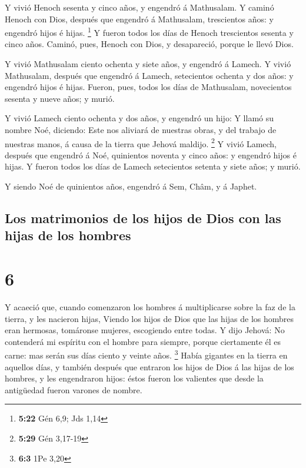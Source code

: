  Y vivió Henoch sesenta y cinco años, y engendró á
Mathusalam.  Y caminó Henoch con Dios, después que
engendró á Mathusalam, trescientos años: y engendró hijos é hijas.
\footnote{\textbf{5:22} Gén 6,9; Jds 1,14}  Y fueron
todos los días de Henoch trescientos sesenta y cinco años.
 Caminó, pues, Henoch con Dios, y desapareció, porque le
llevó Dios.

 Y vivió Mathusalam ciento ochenta y siete años, y
engendró á Lamech.  Y vivió Mathusalam, después que
engendró á Lamech, setecientos ochenta y dos años: y engendró hijos é
hijas.  Fueron, pues, todos los días de Mathusalam,
novecientos sesenta y nueve años; y murió.

 Y vivió Lamech ciento ochenta y dos años, y engendró un
hijo:  Y llamó su nombre Noé, diciendo: Este nos aliviará
de nuestras obras, y del trabajo de nuestras manos, á causa de la tierra
que Jehová maldijo. \footnote{\textbf{5:29} Gén 3,17-19} 
Y vivió Lamech, después que engendró á Noé, quinientos noventa y cinco
años: y engendró hijos é hijas.  Y fueron todos los días
de Lamech setecientos setenta y siete años; y murió.

 Y siendo Noé de quinientos años, engendró á Sem, Châm, y
á Japhet.

\hypertarget{los-matrimonios-de-los-hijos-de-dios-con-las-hijas-de-los-hombres}{%
\subsection{Los matrimonios de los hijos de Dios con las hijas de los
hombres}\label{los-matrimonios-de-los-hijos-de-dios-con-las-hijas-de-los-hombres}}

\hypertarget{section-5}{%
\section{6}\label{section-5}}

 Y acaeció que, cuando comenzaron los hombres á
multiplicarse sobre la faz de la tierra, y les nacieron hijas,
 Viendo los hijos de Dios que las hijas de los hombres
eran hermosas, tomáronse mujeres, escogiendo entre todas. 
Y dijo Jehová: No contenderá mi espíritu con el hombre para siempre,
porque ciertamente él es carne: mas serán sus días ciento y veinte años.
\footnote{\textbf{6:3} 1Pe 3,20}  Había gigantes en la
tierra en aquellos días, y también después que entraron los hijos de
Dios á las hijas de los hombres, y les engendraron hijos: éstos fueron
los valientes que desde la antigüedad fueron varones de nombre.

